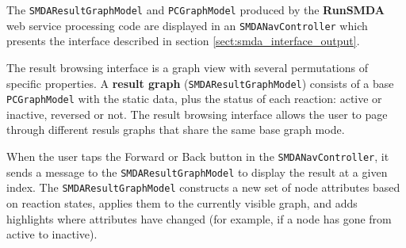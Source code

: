 The \texttt{SMDAResultGraphModel} and \texttt{PCGraphModel} produced by the
\textbf{RunSMDA} web service processing code are displayed in an
\texttt{SMDANavController} which presents the interface described in section
\ref{sect:smda_interface_output}.

The result browsing interface is a graph view with several permutations of
specific properties. A \textbf{result graph} (\texttt{SMDAResultGraphModel})
consists of a base \texttt{PCGraphModel} with the static data, plus the status
of each reaction: active or inactive, reversed or not. The result browsing
interface allows the user to page through different resuls graphs that share the
same base graph mode.

When the user taps the Forward or Back button in the \texttt{SMDANavController},
it sends a message to the \texttt{SMDAResultGraphModel} to display the result at
a given index. The \texttt{SMDAResultGraphModel} constructs a new set of node
attributes based on reaction states, applies them to the currently visible
graph, and adds highlights where attributes have changed (for example, if a node
has gone from active to inactive).
